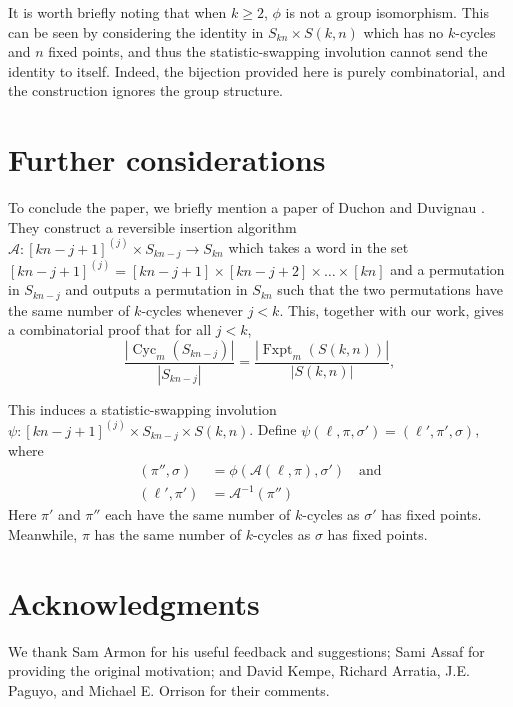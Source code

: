 \documentclass{article}
\numberwithin{theorem}{section}
\theoremstyle{definition}
\newcommand{\Cyc}{\operatorname{Cyc}}
\newcommand{\Fxpt}{\operatorname{Fxpt}}
\begin{document}
It is worth briefly noting that when $k \geq 2$, $\phi$ is not a group isomorphism. This can be seen by considering the identity in $S_{kn} \times S(k,n)$ which has no $k$-cycles and $n$ fixed points, and thus the statistic-swapping involution cannot send the identity to itself. Indeed, the bijection provided here is purely combinatorial, and the construction ignores the group structure.

\section{Further considerations}

To conclude the paper, we briefly mention a paper of Duchon and Duvignau \cite{DuchonDuvignau2016}. They construct a reversible insertion algorithm $\mathcal{A}\colon [kn-j+1]^{(j)} \times S_{kn-j} \to S_{kn}$ which takes a word in the set $[kn-j+1]^{(j)} = [kn-j+1] \times [kn-j+2] \times \dots \times [kn]$ and a permutation in $S_{kn-j}$ and outputs a permutation in $S_{kn}$ such that the two permutations have the same number of $k$-cycles whenever $j < k$. This, together with our work, gives a combinatorial proof that for all $j < k$, \[
    \frac{
        \left|\Cyc_m(S_{kn-j})\right|
    }{
        \left|S_{kn-j}\right|
    } =
    \frac{
        \left|\Fxpt_m\!\left(S(k,n)\right)\right|
    }{
        \left|S(k,n)\right|
    },
\]

This induces a statistic-swapping involution $\psi\colon [kn-j+1]^{(j)} \times S_{kn-j} \times S(k,n)$. Define $\psi(\ell, \pi, \sigma') = (\ell', \pi', \sigma)$, where \begin{align*}
    (\pi'', \sigma) &= \phi(\mathcal A(\ell,\pi), \sigma') \quad\text{and}\\
    (\ell', \pi') &= \mathcal A^{-1}(\pi'')
\end{align*} Here $\pi'$ and $\pi''$ each have the same number of $k$-cycles as $\sigma'$ has fixed points. Meanwhile, $\pi$ has the same number of $k$-cycles as $\sigma$ has fixed points.

\section*{Acknowledgments}
We thank Sam Armon for his useful feedback and suggestions; Sami Assaf for providing the original motivation; and David Kempe, Richard Arratia, J.E. Paguyo, and Michael E. Orrison for their comments.


\end{document}
